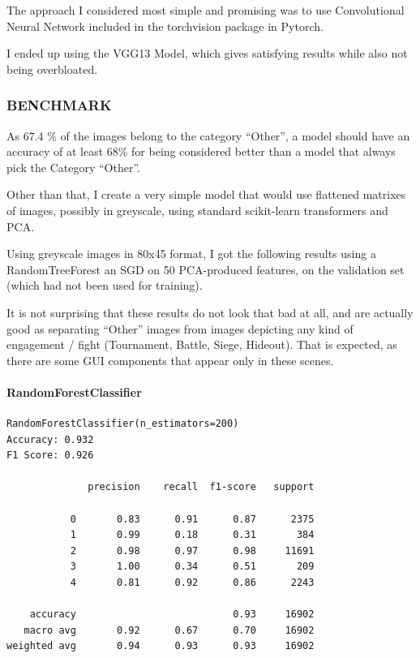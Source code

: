 \documentclass[
]{article}
\begin{document}
The approach I considered most simple and promising was to use
Convolutional Neural Network included in the torchvision package in
Pytorch.

I ended up using the VGG13 Model, which gives satisfying results while
also not being overbloated.

\hypertarget{benchmark}{%
\subsubsection{BENCHMARK}\label{benchmark}}

As 67.4 \% of the images belong to the category ``Other'', a model
should have an accuracy of at least 68\% for being considered better
than a model that always pick the Category ``Other''.

Other than that, I create a very simple model that would use flattened
matrixes of images, possibly in greyscale, using standard scikit-learn
transformers and PCA.

Using greyscale images in 80x45 format, I got the following results
using a RandomTreeForest an SGD on 50 PCA-produced features, on the
validation set (which had not been used for training).

It is not surprising that these results do not look that bad at all, and
are actually good as separating ``Other'' images from images depicting
any kind of engagement / fight (Tournament, Battle, Siege, Hideout).
That is expected, as there are some GUI components that appear only in
these scenes.

\hypertarget{randomforestclassifier}{%
\paragraph{RandomForestClassifier}\label{randomforestclassifier}}

\begin{verbatim}
RandomForestClassifier(n_estimators=200)
Accuracy: 0.932
F1 Score: 0.926

              precision    recall  f1-score   support

           0       0.83      0.91      0.87      2375
           1       0.99      0.18      0.31       384
           2       0.98      0.97      0.98     11691
           3       1.00      0.34      0.51       209
           4       0.81      0.92      0.86      2243

    accuracy                           0.93     16902
   macro avg       0.92      0.67      0.70     16902
weighted avg       0.94      0.93      0.93     16902
\end{verbatim}
\end{document}
